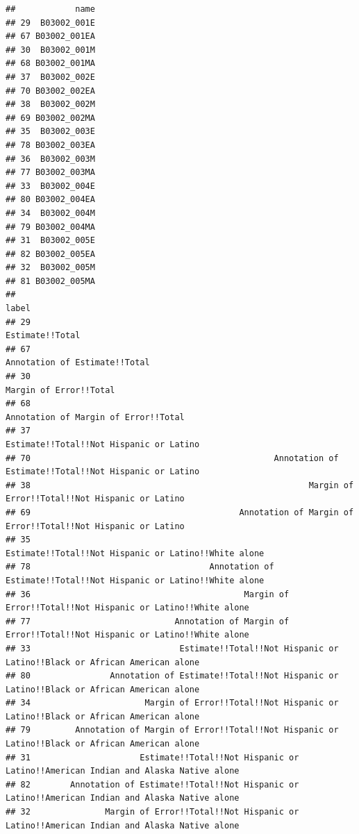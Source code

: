 \documentclass[
  openany]{book}
\begin{document}
\begin{verbatim}
##            name
## 29  B03002_001E
## 67 B03002_001EA
## 30  B03002_001M
## 68 B03002_001MA
## 37  B03002_002E
## 70 B03002_002EA
## 38  B03002_002M
## 69 B03002_002MA
## 35  B03002_003E
## 78 B03002_003EA
## 36  B03002_003M
## 77 B03002_003MA
## 33  B03002_004E
## 80 B03002_004EA
## 34  B03002_004M
## 79 B03002_004MA
## 31  B03002_005E
## 82 B03002_005EA
## 32  B03002_005M
## 81 B03002_005MA
##                                                                                                    label
## 29                                                                                       Estimate!!Total
## 67                                                                         Annotation of Estimate!!Total
## 30                                                                                Margin of Error!!Total
## 68                                                                  Annotation of Margin of Error!!Total
## 37                                                               Estimate!!Total!!Not Hispanic or Latino
## 70                                                 Annotation of Estimate!!Total!!Not Hispanic or Latino
## 38                                                        Margin of Error!!Total!!Not Hispanic or Latino
## 69                                          Annotation of Margin of Error!!Total!!Not Hispanic or Latino
## 35                                                  Estimate!!Total!!Not Hispanic or Latino!!White alone
## 78                                    Annotation of Estimate!!Total!!Not Hispanic or Latino!!White alone
## 36                                           Margin of Error!!Total!!Not Hispanic or Latino!!White alone
## 77                             Annotation of Margin of Error!!Total!!Not Hispanic or Latino!!White alone
## 33                              Estimate!!Total!!Not Hispanic or Latino!!Black or African American alone
## 80                Annotation of Estimate!!Total!!Not Hispanic or Latino!!Black or African American alone
## 34                       Margin of Error!!Total!!Not Hispanic or Latino!!Black or African American alone
## 79         Annotation of Margin of Error!!Total!!Not Hispanic or Latino!!Black or African American alone
## 31                      Estimate!!Total!!Not Hispanic or Latino!!American Indian and Alaska Native alone
## 82        Annotation of Estimate!!Total!!Not Hispanic or Latino!!American Indian and Alaska Native alone
## 32               Margin of Error!!Total!!Not Hispanic or Latino!!American Indian and Alaska Native alone

\end{verbatim}
\end{document}
